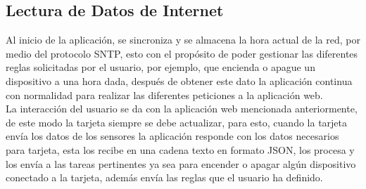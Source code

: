 \subsection{Lectura de Datos de Internet}

Al inicio de la aplicación, se sincroniza y se almacena la hora actual de la red, por medio del protocolo SNTP, esto con el propósito de poder gestionar las diferentes reglas solicitadas por el usuario, por ejemplo, que encienda o apague un dispositivo a una hora dada, después de obtener este dato la aplicación continua con normalidad para realizar las diferentes peticiones a la aplicación web.\\

La interacción del usuario se da con la aplicación web mencionada anteriormente, de este modo la tarjeta siempre se debe actualizar, para esto, cuando la tarjeta envía los datos de los sensores la aplicación responde con los datos necesarios para tarjeta, esta los recibe en una cadena texto en formato JSON, los procesa y los envía a las tareas pertinentes ya sea para encender o apagar algún dispositivo conectado a la tarjeta, además envía las reglas que el usuario ha definido.
